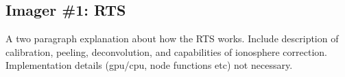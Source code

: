 \subsection{Imager \#1: RTS}
A two paragraph explanation about how the RTS works. Include description of calibration, peeling, deconvolution, and capabilities of ionosphere correction. Implementation details (gpu/cpu, node functions etc) not necessary.